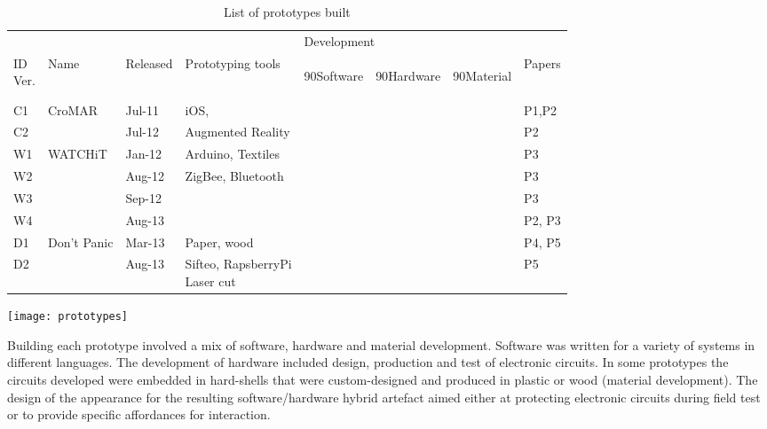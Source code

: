 \begin{table}
	[!p] \centering \caption{List of prototypes built} \label{tab:prototypes} 
	\begin{threeparttable}
		\begin{tabular}{@{}llllllll@{}} 
			\toprule 
			& & & & \multicolumn{3}{l}{Development}  \\
			\cline{5-7} \noalign{\smallskip} 
			\specialcell[b]{ID\\Ver.} & Name & Released & Prototyping tools & 
			\begin{turn}
				{90}Software
			\end{turn}
			& 
			\begin{turn}
				{90}Hardware
			\end{turn}
			& 
			\begin{turn}
				{90}Material
			\end{turn}
			& Papers \\
			\midrule \noalign{\smallskip} C1 & CroMAR & Jul-11 & iOS, & \textbullet & & & P1,P2 \\
			C2 & & Jul-12 & Augmented Reality & \textbullet & & & P2 \\
			\hline \noalign{\smallskip} W1 & WATCHiT & Jan-12 & Arduino, Textiles & \textbullet & \textbullet & & P3 \\
			W2 & & Aug-12 & ZigBee, Bluetooth & \textbullet & \textbullet & & P3 \\
			W3 & & Sep-12 & & \textbullet & \textbullet & & P3 \\
			W4 & & Aug-13 & & \textbullet & \textbullet & \textbullet & P2, P3 \\
			\hline \noalign{\smallskip} D1 & Don't Panic & Mar-13 & Paper, wood & & & \textbullet & P4, P5 \\
			D2 & & Aug-13 & \specialcell[t]{Sifteo, RapsberryPi\\Laser cut} & \textbullet & \textbullet & \textbullet & P5 \\
			\bottomrule 
		\end{tabular}
		\begin{tablenotes}
			\item 
			\texttt{[image: prototypes]} 
		\end{tablenotes}
	\end{threeparttable}
\end{table}

Building each prototype involved a mix of software, hardware and material development. Software was written for a variety of systems in different languages. The development of hardware included design, production and test of electronic circuits. In some prototypes the circuits developed were embedded in hard-shells that were custom-designed and produced in plastic or wood (material development). The design of the appearance for the resulting software/hardware hybrid artefact aimed either at protecting electronic circuits during field test or to provide specific affordances for interaction.

